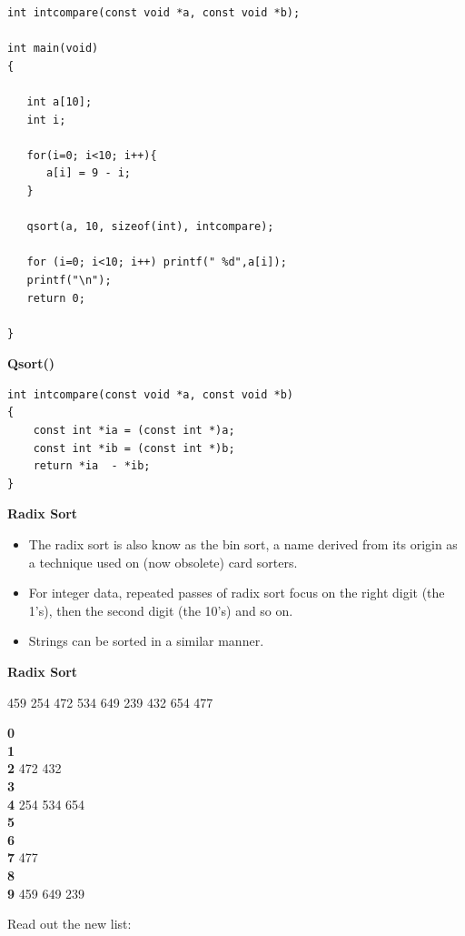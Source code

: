 \documentclass[a4,portraitt]{slides}
\begin{document}
{{\begin{verbatim}
int intcompare(const void *a, const void *b);

int main(void)
{

   int a[10];
   int i;

   for(i=0; i<10; i++){
      a[i] = 9 - i;
   }

   qsort(a, 10, sizeof(int), intcompare);

   for (i=0; i<10; i++) printf(" %d",a[i]);
   printf("\n");
   return 0;

}
\end{verbatim}
}

\newpage
{\samepage
\begin{center}
{\Large{\bf Qsort()}}
\end{center}
\begin{verbatim}
int intcompare(const void *a, const void *b)
{
    const int *ia = (const int *)a;
    const int *ib = (const int *)b;
    return *ia  - *ib;
}
\end{verbatim}
}

\newpage
{\samepage
\begin{center}
{\Large{\bf Radix Sort}}
\end{center}
\begin{itemize}
\item The radix sort is also know as the bin sort, a name
derived from its origin as a technique used on (now obsolete)
card sorters.
\item For integer data, repeated passes of radix sort focus
on the right digit (the 1's), then the second digit (the 10's)
and so on.
\item Strings can be sorted in a similar manner.
\end{itemize}
}

\newpage
{\samepage
\begin{center}
{\Large{\bf Radix Sort}}
\end{center}

459 254 472 534 649 239 432 654 477

{\bf 0}\\
{\bf 1}\\
{\bf 2} 472 432\\
{\bf 3}\\
{\bf 4} 254 534 654\\
{\bf 5}\\
{\bf 6}\\
{\bf 7} 477\\
{\bf 8}\\
{\bf 9} 459 649 239

Read out the new list:

}}
\end{document}
